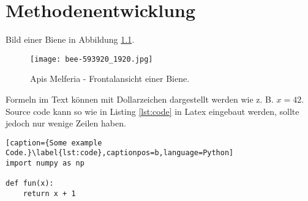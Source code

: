 
\chapter{Methodenentwicklung} %
\label{cha:methodenentwicklung}

Bild einer Biene in Abbildung \ref{fig:bee}.

\begin{figure}[h]
    \centering
    \texttt{[image: bee-593920\_1920.jpg]}
    \caption[Biene]{Apis Melferia - Frontalansicht einer Biene.}
    \label{fig:bee}
\end{figure}

Formeln im Text können mit Dollarzeichen dargestellt werden wie z. B. $x = 42$. Source code kann so wie in Listing \ref{lst:code} in Latex eingebaut werden, sollte jedoch nur wenige Zeilen haben.

\begin{lstlisting}[caption={Some example Code.}\label{lst:code},captionpos=b,language=Python] 
import numpy as np

def fun(x):
    return x + 1
\end{lstlisting}
